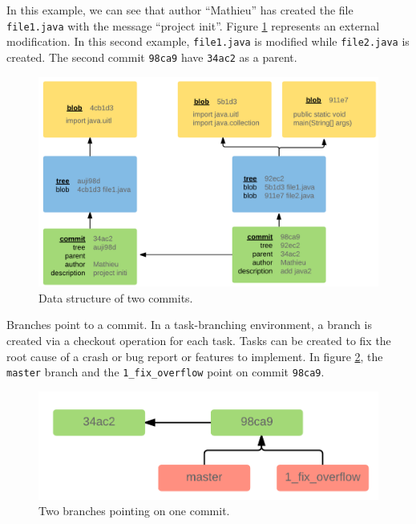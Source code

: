 \documentclass[12pt]{report}
\begin{document}
In this example, we can see that author ``Mathieu'' has created the file
\lstinline!file1.java! with the message ``project init''. Figure
\ref{fig:two-commits} represents an external modification. In this
second example, \lstinline!file1.java! is modified while
\lstinline!file2.java! is created. The second commit \lstinline!98ca9!
have \lstinline!34ac2! as a parent.

\begin{figure}[h!]
  \centering
    \includegraphics[scale=0.25]{media/branching.png}
    \caption{Data structure of two commits.
    \label{fig:two-commits}}
\end{figure}

Branches point to a commit. In a task-branching environment, a branch is
created via a checkout operation for each task. Tasks can be created to
fix the root cause of a crash or bug report or features to implement. In
figure \ref{fig:two-branches}, the \lstinline!master! branch and the
\lstinline!1_fix_overflow! point on commit \lstinline!98ca9!.

\begin{figure}[h!]
  \centering
    \includegraphics[scale=0.25]{media/2branches.png}
    \caption{Two branches pointing on one commit.
    \label{fig:two-branches}}
\end{figure}
\end{document}
